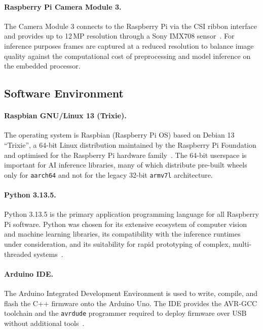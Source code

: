 \paragraph{Raspberry Pi Camera Module 3.}
The Camera Module 3 connects to the Raspberry Pi via the CSI ribbon
interface and provides up to 12\,MP resolution through a Sony IMX708
sensor~\cite{picamera2023}. For inference purposes frames are captured
at a reduced resolution to balance image quality against the
computational cost of preprocessing and model inference on the
embedded processor.
 
\subsection{Software Environment}
 
\paragraph{Raspbian GNU/Linux 13 (Trixie).}
The operating system is Raspbian (Raspberry Pi OS) based on Debian 13
``Trixie'', a 64-bit Linux distribution maintained by the Raspberry Pi
Foundation and optimised for the Raspberry Pi hardware
family~\cite{raspios2024}. The 64-bit userspace is important for AI
inference libraries, many of which distribute pre-built wheels only
for \texttt{aarch64} and not for the legacy 32-bit \texttt{armv7l}
architecture.
 
\paragraph{Python 3.13.5.}
Python 3.13.5 is the primary application programming language for all
Raspberry Pi software. Python was chosen for its extensive ecosystem
of computer vision and machine learning libraries, its compatibility
with the inference runtimes under consideration, and its suitability
for rapid prototyping of complex, multi-threaded
systems~\cite{python313}.
 
\paragraph{Arduino IDE.}
The Arduino Integrated Development Environment is used to write,
compile, and flash the C++ firmware onto the Arduino Uno. The IDE
provides the AVR-GCC toolchain and the \texttt{avrdude} programmer
required to deploy firmware over USB without additional
tools~\cite{arduinoide}.
 
